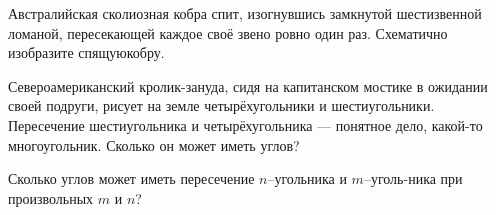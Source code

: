 ﻿

\begin{itemize}
 Австралийская сколиозная кобра спит, изогнувшись замкнутой шестизвенной ломаной, пересекающей каждое своё звено ровно один раз. Схематично изобразите спящую\linebreak кобру.

\itB Североамериканский кролик-зануда, сидя на капитанском мостике в ожидании своей подруги, рисует на земле четырёхугольники и шестиугольники. Пересечение шестиугольника и четырёхугольника — понятное дело, какой-то многоугольник. Сколько он может иметь углов?

\itC Сколько углов может иметь пересечение $n$--угольника и $m$--уголь-\linebreak ника при произвольных $m$ и $n$?
\end{itemize}